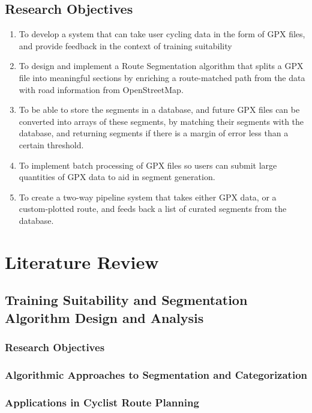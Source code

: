\documentclass[11pt,a4paper]{report}
\begin{document}
\section{Research Objectives}
\begin{enumerate}
	\item To develop a system that can take user cycling data in the form of GPX files, and provide feedback in the context of training suitability
	\item To design and implement a Route Segmentation algorithm that splits a GPX file into meaningful sections by enriching a route-matched
	      path from the data with road information from OpenStreetMap.
	\item To be able to store the segments in a database, and future GPX files can be converted into arrays of these segments, by matching their
	      segments with the database, and returning segments if there is a margin of error less than a certain threshold.
	\item To implement batch processing of GPX files so users can submit large quantities of GPX data to aid in segment generation.
	\item To create a two-way pipeline system that takes either GPX data, or a custom-plotted route, and feeds back a list of curated segments from the database.
\end{enumerate}





\chapter{Literature Review}
\label{chap:litreview}

\section{Training Suitability and Segmentation Algorithm Design and Analysis}

\subsection{Research Objectives}
\subsection{Algorithmic Approaches to Segmentation and Categorization}
\subsection{Applications in Cyclist Route Planning}
\end{document}
